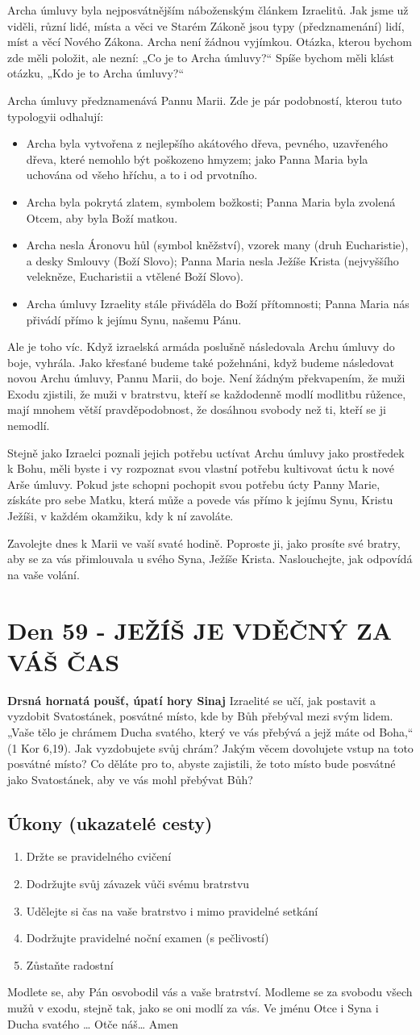 \documentclass[11pt]{article}
\newcommand{\zacatekDevatyTyden}{
\textbf{Drsná hornatá poušť, úpatí hory Sinaj} \newline 
Izraelité se učí, jak postavit a vyzdobit Svatostánek, posvátné místo, kde by Bůh přebýval mezi svým lidem. „Vaše tělo je chrámem Ducha svatého, který ve vás přebývá a jejž máte od Boha,“ (1 Kor 6,19). Jak vyzdobujete svůj chrám? Jakým věcem dovolujete vstup na toto posvátné místo? Co děláte pro to, abyste zajistili, že toto místo bude posvátné jako Svatostánek, aby ve vás mohl přebývat Bůh?

\subsection*{Úkony (ukazatelé cesty)}
\begin{enumerate}
  \item Držte se pravidelného cvičení
  \item Dodržujte svůj závazek vůči svému bratrstvu
  \item Udělejte si čas na vaše bratrstvo i mimo pravidelné setkání
  \item Dodržujte pravidelné noční examen (s pečlivostí)
  \item Zůstaňte radostní
\end{enumerate}
Modlete se, aby Pán osvobodil vás a vaše bratrství. \newline
Modleme se za svobodu všech mužů v exodu, stejně tak, jako se oni modlí za vás.\newline
Ve jménu Otce i Syna i Ducha svatého …  Otče náš… Amen
}
\begin{document}
Archa úmluvy byla nejposvátnějším náboženským článkem Izraelitů. Jak jsme už viděli, různí lidé, místa a věci ve
Starém Zákoně jsou typy (předznamenání) lidí, míst a věcí Nového Zákona. Archa není žádnou vyjímkou. Otázka,
kterou bychom zde měli položit, ale nezní: „Co je to Archa úmluvy?“ Spíše bychom měli klást otázku, „Kdo je to
Archa úmluvy?“

Archa úmluvy předznamenává Pannu Marii. Zde je pár podobností, kterou tuto typologyii odhalují:
\begin{itemize}
  \item Archa byla vytvořena z nejlepšího akátového dřeva, pevného, uzavřeného dřeva, které nemohlo být poškozeno hmyzem; jako Panna Maria byla uchována od všeho hříchu, a to i od prvotního.
  \item Archa byla pokrytá zlatem, symbolem božkosti; Panna Maria byla zvolená Otcem, aby byla Boží matkou.
  \item Archa nesla Áronovu hůl (symbol kněžství), vzorek many (druh Eucharistie), a desky Smlouvy (Boží Slovo); Panna Maria nesla Ježíše Krista (nejvyššího velekněze, Eucharistii a vtělené Boží Slovo).
  \item Archa úmluvy Izraelity stále přiváděla do Boží přítomnosti; Panna Maria nás přivádí přímo k jejímu Synu, našemu Pánu.
\end{itemize}

Ale je toho víc. Když izraelská armáda poslušně následovala Archu úmluvy do boje, vyhrála. Jako křesťané budeme
také požehnáni, když budeme následovat novou Archu úmluvy, Pannu Marii, do boje. Není žádným překvapením, že
muži Exodu zjistili, že muži v bratrstvu, kteří se každodenně modlí modlitbu růžence, mají mnohem větší
pravděpodobnost, že dosáhnou svobody než ti, kteří se ji nemodlí.

Stejně jako Izraelci poznali jejich potřebu uctívat Archu úmluvy jako prostředek k Bohu, měli byste i vy rozpoznat
svou vlastní potřebu kultivovat úctu k nové Arše úmluvy. Pokud jste schopni pochopit svou potřebu úcty Panny Marie,
získáte pro sebe Matku, která může a povede vás přímo k jejímu Synu, Kristu Ježíši, v každém okamžiku, kdy k ní
zavoláte.

Zavolejte dnes k Marii ve vaší svaté hodině. Poproste ji, jako prosíte své bratry, aby se za vás přimlouvala u svého
Syna, Ježíše Krista. Naslouchejte, jak odpovídá na vaše volání.


\newpage
\section{Den 59 - JEŽÍŠ JE VDĚČNÝ ZA VÁŠ ČAS}
\zacatekDevatyTyden
\end{document}
